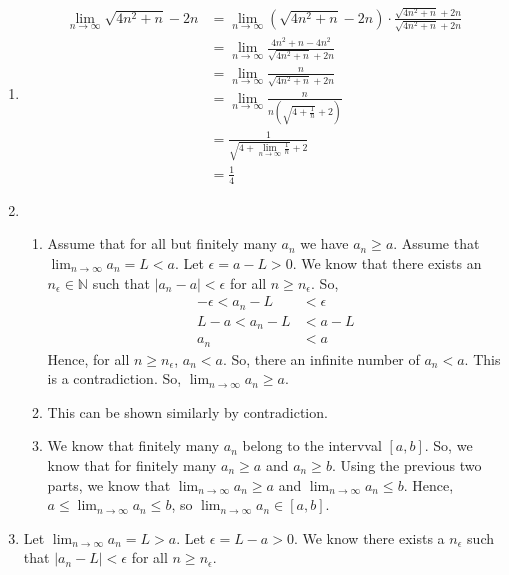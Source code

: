 \documentclass[12pt]{article}
\begin{document}
\begin{enumerate}[start=1,label={\bfseries Problem \arabic*:},leftmargin=1in]
    \item \begin{align*}
        \lim_{n \to \infty} \sqrt{4n^{2} + n} - 2n &= \lim_{n \to \infty} (\sqrt{4n^{2} + n} - 2n)\cdot \frac{\sqrt{4n^{2} + n} + 2n}{\sqrt{4n^{2} + n} + 2n}\\
        &= \lim_{n \to \infty} \frac{4n^{2} + n - 4n^{2}}{\sqrt{4n^{2} + n} + 2n}\\
        &= \lim_{n \to \infty} \frac{n}{\sqrt{4n^{2} + n} + 2n}\\
        &= \lim_{n \to \infty} \frac{n}{n(\sqrt{4 + \frac{1}{n}} + 2)}\\
        &= \frac{1}{\sqrt{4 + \lim_{n \to \infty}\frac{1}{n}} + 2}\\
        &= \frac{1}{4}
    \end{align*}
    \item \begin{enumerate}
        \item Assume that for all but finitely many $a_{n}$ we have $a_{n} \geq a$. Assume that $\lim_{n \to \infty} a_{n} = L < a$. 
        Let $\epsilon = a - L > 0$. We know that there exists an $n_{\epsilon} \in \mathbb{N}$ such that $|a_{n} - a| < \epsilon$ for all $n \geq n_{\epsilon}$.
        So, \begin{align*}
            -\epsilon < a_{n} - L &< \epsilon\\ 
            L - a < a_{n} - L &< a - L \\ 
            a_{n} &< a
        \end{align*} 
        Hence, for all $n \geq n_{\epsilon}$, $a_{n} < a$. So, there an infinite number of $a_{n} < a$. This is a contradiction. So, $\lim_{n \to \infty} a_{n} \geq a$.

        \item This can be shown similarly by contradiction. 
        \item We know that finitely many $a_{n}$ belong to the intervval $[ a, b]$. So, we know that for finitely many $a_{n} \geq a$ and $a_{n} \geq b$. Using the previous two parts,
        we know that $\lim_{n \to \infty} a_{n} \geq a$ and $\lim_{n \to \infty} a_{n} \leq b$. Hence, $a \leq \lim_{n \to \infty} a_{n} \leq b$, so $\lim_{n \to \infty} a_{n} \in [a, b]$.
    \end{enumerate}
    \item Let $\lim_{n \to \infty} a_{n} = L > a$. Let $\epsilon = L - a > 0$. 
    We know there exists a $n_{\epsilon}$ such that $|a_{n} - L| < \epsilon$ for all $n \geq n_{\epsilon}$.


\end{enumerate}
\end{document}
